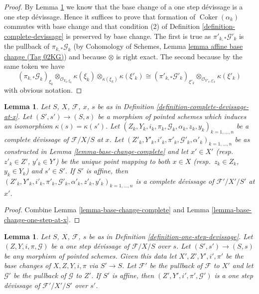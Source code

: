 \documentclass{amsart}
\theoremstyle{plain}
\newtheorem{lemma}[subsection]{Lemma}
\theoremstyle{definition}
\theoremstyle{remark}
\numberwithin{equation}{subsection}
\def\Coker{\mathop{\mathrm{Coker}}}
\begin{document}
\begin{proof}
By
Lemma \ref{lemma-base-change-one-step}
we know that the base change of a one step d\'evissage is a one step
d\'evissage. Hence it suffices to prove that formation of
$\Coker(\alpha_k)$ commutes with base change and that
condition (2) of
Definition \ref{definition-complete-devissage}
is preserved by base change. The first is true as
$\pi'_{k, *}\mathcal{G}'_k$ is the pullback of
$\pi_{k, *}\mathcal{G}_k$ (by
Cohomology of Schemes, Lemma \href{https://stacks.math.columbia.edu/tag/02KG}{lemma affine base change (Tag 02KG)})
and because $\otimes$ is right exact. The second because
by the same token we have
$$
(\pi_{k, *}\mathcal{G}_k)_{\xi_k}
\otimes_{\mathcal{O}_{Y_k, \xi_k}} \kappa(\xi_k)
\otimes_{\kappa(\xi_k)} \kappa(\xi'_k)
\cong
(\pi'_{k, *}\mathcal{G}'_k)_{\xi'_k}
\otimes_{\mathcal{O}_{Y'_k, \xi'_k}} \kappa(\xi'_k)
$$
with obvious notation.
\end{proof}


\begin{lemma}
\label{lemma-base-change-complete-at-x}
Let $S$, $X$, $\mathcal{F}$, $x$, $s$ be as in
Definition \ref{definition-complete-devissage-at-x}.
Let $(S', s') \to (S, s)$ be a morphism of pointed schemes
which induces an isomorphism $\kappa(s) = \kappa(s')$. Let
$(Z_k, Y_k, i_k, \pi_k, \mathcal{G}_k, \alpha_k, z_k, y_k)_{k = 1, \ldots, n}$
be a complete d\'evissage of $\mathcal{F}/X/S$ at $x$.
Let
$(Z'_k, Y'_k, i'_k, \pi'_k, \mathcal{G}'_k, \alpha'_k)_{k = 1, \ldots, n}$
be as constructed in
Lemma \ref{lemma-base-change-complete}
and let $x' \in X'$ (resp.\ $z'_k \in Z'$, $y'_k \in Y'$) be the
unique point mapping to both $x \in X$ (resp.\ $z_k \in Z_k$, $y_k \in Y_k$)
and $s' \in S'$.
If $S'$ is affine, then
$(Z'_k, Y'_k, i'_k, \pi'_k, \mathcal{G}'_k, \alpha'_k,
z'_k, y'_k)_{k = 1, \ldots, n}$
is a complete d\'evissage of $\mathcal{F}'/X'/S'$ at $x'$.
\end{lemma}

\begin{proof}
Combine
Lemma \ref{lemma-base-change-complete}
and
Lemma \ref{lemma-base-change-one-step-at-x}.
\end{proof}


\begin{lemma}
\label{lemma-base-change-one-step}
Let $S$, $X$, $\mathcal{F}$, $s$ be as in
Definition \ref{definition-one-step-devissage}.
Let $(Z, Y, i, \pi, \mathcal{G})$ be a one step d\'evissage
of $\mathcal{F}/X/S$ over $s$.
Let $(S', s') \to (S, s)$ be any morphism of pointed schemes.
Given this data let $X', Z', Y', i', \pi'$ be the base
changes of $X, Z, Y, i, \pi$ via $S' \to S$.
Let $\mathcal{F}'$ be the pullback of $\mathcal{F}$ to $X'$
and let $\mathcal{G}'$ be the pullback of $\mathcal{G}$ to $Z'$.
If $S'$ is affine, then $(Z', Y', i', \pi', \mathcal{G}')$
is a one step d\'evissage of $\mathcal{F}'/X'/S'$ over $s'$.
\end{lemma}
\end{document}
